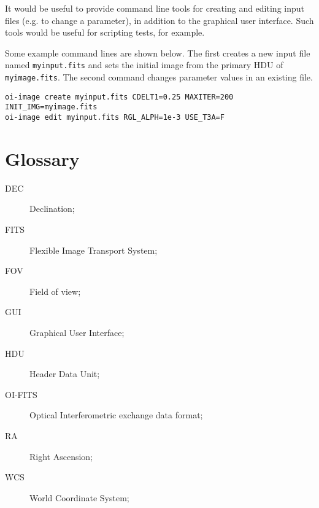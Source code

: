 \documentclass{article}
\begin{document}
It would be useful to provide command line tools for creating and
editing input files (e.g. to change a parameter), in addition to the
graphical user interface. Such tools would be useful for scripting
tests, for example.

Some example command lines are shown below. The first creates a new input
file named \verb+myinput.fits+ and sets the initial image from the
primary HDU of \verb+myimage.fits+. The second command changes
parameter values in an existing file.

\begin{verbatim}
oi-image create myinput.fits CDELT1=0.25 MAXITER=200 INIT_IMG=myimage.fits
oi-image edit myinput.fits RGL_ALPH=1e-3 USE_T3A=F
\end{verbatim}

\appendix
\section{Glossary}

\begin{description}
\item[DEC] Declination;
\item[FITS] Flexible Image Transport System;
\item[FOV] Field of view;
\item[GUI] Graphical User Interface;
\item[HDU] Header Data Unit;
\item[OI-FITS] Optical Interferometric exchange data format;
\item[RA] Right Ascension;
\item[WCS] World Coordinate System;
\end{description}



\end{document}
